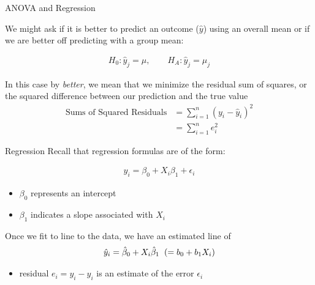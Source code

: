 \documentclass{beamer}
\begin{document}
\begin{frame}{ANOVA and Regression}

We might ask if it is better to predict an outcome ($\hat{y}$) using an overall mean or if we are better off predicting with a group mean:

\begin{align*}
H_0: \hat{y}_{j} = \mu, \qquad H_A: \hat{y}_j = \mu_j
\end{align*} \vspace{6mm}

In this case by \textit{better}, we mean that we minimize the residual sum of squares, or the squared difference between our prediction and the true value
\begin{align*}
\text{Sums of Squared Residuals} &= \sum_{i=1}^n (y_i - \hat{y}_i)^2 \\
&= \sum_{i=1}^n e_i^2
\end{align*}


\end{frame}

\begin{frame}{Regression}
Recall that regression formulas are of the form:

\begin{align*}
y_i = \beta_0 + X_i \beta_1 + \epsilon_i
\end{align*}

\begin{itemize}
    \item $\beta_0$ represents an intercept
    \item $\beta_1$ indicates a slope associated with $X_i$
\end{itemize} \vspace{12mm}

Once we fit to line to the data, we have an estimated line of
\begin{align*}
\hat{y}_i = \hat{\beta}_0 + X_i \hat{\beta}_1 \hspace{2mm} (= b_0 + b_1X_i)
\end{align*}

\begin{itemize}
    \item residual $e_i = y_i - \hat{y}_i$ is an estimate of the error $\epsilon_i$
\end{itemize}
\end{frame}
\end{document}
